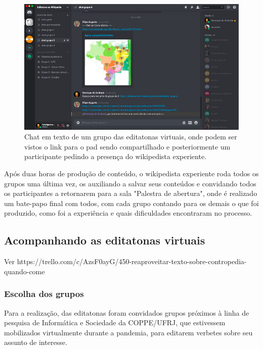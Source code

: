 \begin{figure}[H]
    \centering
    \includegraphics[width=1\textwidth]{Images/discord_full.png}
    \caption{Chat em texto de um grupo das editatonas virtuais, onde podem ser vistos o link para o pad sendo compartilhado e posteriormente um participante pedindo a presença do wikipedista experiente.}
    \label{fig:discord_chat}
\end{figure}

Após duas horas de produção de conteúdo, o wikipedista experiente roda todos os grupos uma última vez, os auxiliando a salvar seus conteúdos e convidando todos os participantes a retornarem para a sala "Palestra de abertura", onde é realizado um bate-papo final com todos, com cada grupo contando para os demais o que foi produzido, como foi a experiência e quais dificuldades encontraram no processo.

\subsection{Acompanhando as editatonas virtuais}

Ver https://trello.com/c/AzsF0ayG/450-reaproveitar-texto-sobre-contropedia-quando-come%

\subsubsection{Escolha dos grupos}

Para a realização, das editatonas foram convidados grupos próximos à linha de pesquisa de Informática e Sociedade da COPPE/UFRJ, que estivessem mobilizados virtualmente durante a pandemia, para editarem verbetes sobre seu assunto de interesse.

